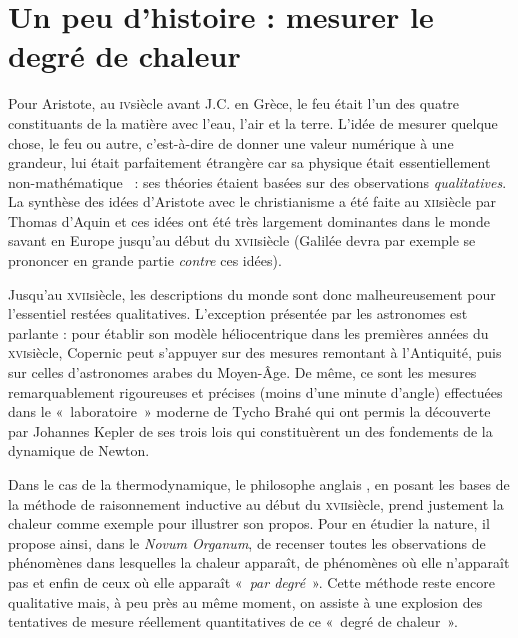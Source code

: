 \atstartofhistorysection
\section[Un peu d’histoire : mesurer le degré de chaleur]{Un peu d’histoire :\onlyamphibook{\\} mesurer le degré de chaleur}
\label{ch_histoire_degre_chaleur_depondt}


	Pour Aristote, au \textsc{iv}\ieme siècle avant J.C. en Grèce, le feu était l'un des quatre constituants de la matière avec l'eau, l'air et la terre. L'idée de mesurer quelque chose, le feu ou autre, c'est-à-dire de donner une valeur numérique à une grandeur, lui était parfaitement étrangère car sa physique était essentiellement non-mathématique~\cite{koyre1966} : ses théories étaient basées sur des observations \emph{qualitatives}. La synthèse des idées d'Aristote avec le christianisme a été faite au \textsc{xii}\ieme siècle par Thomas d'Aquin et ces idées ont été très largement dominantes dans le monde savant en Europe jusqu'au début du \textsc{xvii}\ieme siècle (Galilée devra par exemple se prononcer en grande partie \emph{contre} ces idées).
	
	Jusqu’au \textsc{xvii}\ieme siècle, les descriptions du monde sont donc malheureusement pour l'essentiel restées qualitatives. L’exception présentée par les astronomes est parlante : pour établir son modèle héliocentrique dans les premières années du \textsc{xvi}\ieme siècle, Copernic peut s'appuyer sur des mesures remontant à l'Antiquité, puis sur celles d’astronomes arabes du Moyen-Âge. De même, ce sont les mesures remarquablement rigoureuses et précises (moins d'une minute d'angle) effectuées dans le «~laboratoire~» moderne de Tycho Brahé qui ont permis la découverte par Johannes Kepler de ses trois lois qui constituèrent un des fondements de la dynamique de Newton.
		
	Dans le cas de la thermodynamique, le philosophe anglais , en posant les bases de la méthode de raisonnement inductive au début du \textsc{xvii}\ieme siècle, prend justement la chaleur comme exemple pour illustrer son propos. Pour en étudier la nature, il propose ainsi, dans le \textit{Novum Organum}, de recenser toutes les observations de phénomènes dans lesquelles la chaleur apparaît, de phénomènes où elle n'apparaît pas et enfin de ceux où elle apparaît «~\emph{par degré}~». Cette méthode reste encore qualitative mais, à peu près au même moment, on assiste à une explosion des tentatives de mesure réellement quantitatives de ce «~degré de chaleur~».
	
